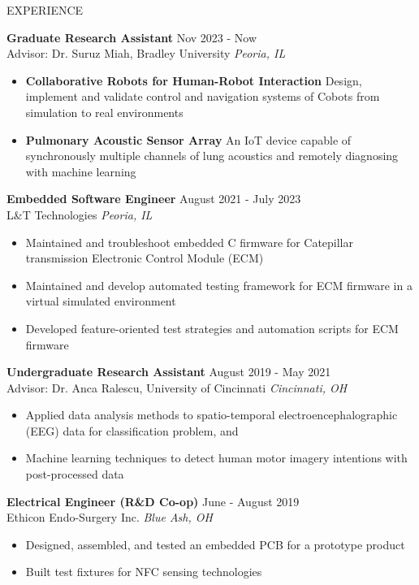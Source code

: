 \documentclass{lib/resume} %
\begin{document}
\begin{rSection}{EXPERIENCE}

    \textbf{Graduate Research Assistant} \hfill Nov 2023 - Now \\
    Advisor: Dr. Suruz Miah, Bradley University \hfill \textit{Peoria, IL}
    \begin{itemize}
        \itemsep -4pt {}
        \item \textbf{Collaborative Robots for Human-Robot Interaction} Design,
        implement and validate control and navigation systems of Cobots from
        simulation to real environments
        \item \textbf{Pulmonary Acoustic Sensor Array} An IoT device capable of
        synchronously multiple channels of lung acoustics and remotely diagnosing with machine learning
    \end{itemize}

    \textbf{Embedded Software Engineer} \hfill August 2021 - July 2023 \\
    L\&T Technologies \hfill \textit{Peoria, IL}
    \begin{itemize}
        \itemsep -4pt {}
        \item Maintained and troubleshoot embedded C firmware for Catepillar transmission Electronic Control Module (ECM)
        \item Maintained and develop automated testing framework for ECM firmware in a virtual simulated environment
        \item Developed feature-oriented test strategies and automation scripts for ECM firmware
    \end{itemize}

    \textbf{Undergraduate Research Assistant} \hfill August 2019 - May 2021 \\
    Advisor: Dr. Anca Ralescu, University of Cincinnati \hfill \textit{Cincinnati, OH}
    \begin{itemize}
        \itemsep -4pt {}
        \item Applied data analysis methods to spatio-temporal electroencephalographic (EEG) data for classification problem, and
        \item Machine learning techniques to detect human motor imagery intentions with post-processed data
    \end{itemize}


    \textbf{Electrical Engineer (R\&D Co-op)} \hfill June - August 2019\\
    Ethicon Endo-Surgery Inc. \hfill \textit{Blue Ash, OH}
    \begin{itemize}
        \itemsep -4pt {}
        \item Designed, assembled, and tested an embedded PCB for a prototype product
        \item Built test fixtures for NFC sensing technologies
    \end{itemize}


\end{rSection}
\end{document}

